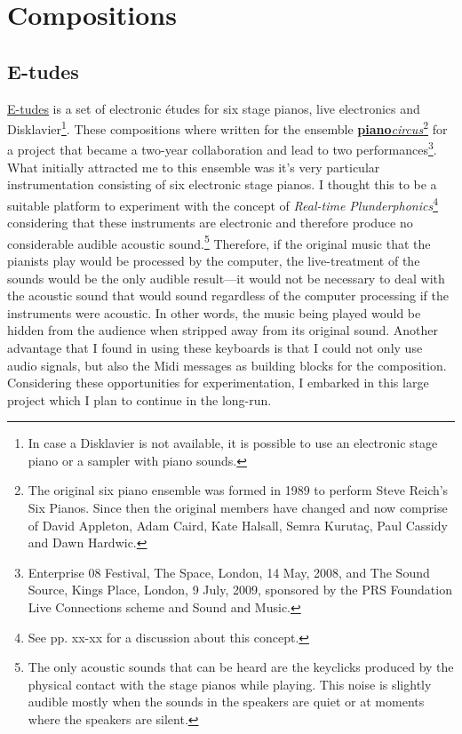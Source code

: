 \hypertarget{chapter6}{}
\chapter{Compositions}

\section{E-tudes}

\href{http://www.ranchonotorious.org/freuben/e-tudes}{E-tudes} is a set of electronic \'{e}tudes for six stage pianos, live electronics and Disklavier\footnote{In case a Disklavier is not available, it is possible to use an electronic stage piano or a sampler with piano sounds.}. These compositions where written for the ensemble \href{http://www.pianocircus.com/}{\textbf{piano}\emph{circus}}\footnote{The original six piano ensemble was formed in 1989 to perform Steve Reich's Six Pianos. Since then the original members have changed and now comprise of David Appleton, Adam Caird, Kate Halsall, Semra Kurutaç, Paul Cassidy and Dawn Hardwic.} for a project that became a two-year collaboration and lead to two performances\footnote{Enterprise 08 Festival, The Space, London, 14 May, 2008, and The Sound Source, Kings Place, London, 9 July, 2009, sponsored by the PRS Foundation Live Connections scheme and Sound and Music.}. What initially attracted me to this ensemble was it's very particular instrumentation consisting of six electronic stage pianos. I thought this to be a suitable platform to experiment with the concept of \emph{Real-time Plunderphonics}\footnote{See pp. xx-xx for a discussion about this concept.} considering that these instruments are electronic and therefore produce no considerable audible acoustic sound.\footnote{The only acoustic sounds that can be heard are the keyclicks produced by the physical contact with the stage pianos while playing. This noise is slightly audible mostly when the sounds in the speakers are quiet or at moments where the speakers are silent.} Therefore, if the original music that the pianists play would be processed by the computer, the live-treatment of the sounds would be the only audible result---it would not be necessary to deal with the acoustic sound that would sound regardless of the computer processing if the instruments were acoustic. In other words, the music being played would be hidden from the audience when stripped away from its original sound. Another advantage that I found in using these keyboards is that I could not only use audio signals, but also the Midi messages as building blocks for the composition. Considering these opportunities for experimentation, I embarked in this large project which I plan to continue in the long-run. 

